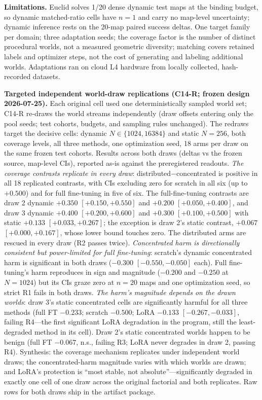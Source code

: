 \documentclass[letterpaper]{article} %
\begin{document}
\textbf{Limitations.} Euclid solves 1/20 dense dynamic test maps at the binding budget, so dynamic matched-ratio cells have $n{=}1$ and carry no map-level uncertainty; dynamic inference rests on the 20-map paired success deltas. One target family per domain; three adaptation seeds; the coverage factor is the number of distinct procedural worlds, not a measured geometric diversity; matching covers retained labels and optimizer steps, not the cost of generating and labeling additional worlds. Adaptations ran on cloud L4 hardware from locally collected, hash-recorded datasets.

\textbf{Targeted independent world-draw replications (C14-R; frozen design 2026-07-25).} Each original cell used one deterministically sampled world set; C14-R re-draws the world streams independently (draw offsets entering only the pool seeds; test cohorts, budgets, and sampling rules unchanged). The redraws target the decisive cells: dynamic $N \in \{1024, 16384\}$ and static $N{=}256$, both coverage levels, all three methods, one optimization seed, 18 arms per draw on the same frozen test cohorts. Results across both draws (deltas vs the frozen source, map-level CIs), reported as-is against the preregistered readouts. \emph{The coverage contrasts replicate in every draw}: distributed$-$concentrated is positive in all 18 replicated contrasts, with CIs excluding zero for scratch in all six (up to $+0.500$) and for full fine-tuning in five of six. The full-fine-tuning contrasts are draw 2 dynamic $+0.350$ $[+0.150,+0.550]$ and $+0.200$ $[+0.050,+0.400]$, and draw 3 dynamic $+0.400$ $[+0.200,+0.600]$ and $+0.300$ $[+0.100,+0.500]$ with static $+0.133$ $[+0.033,+0.267]$; the exception is draw 2's static contrast, $+0.067$ $[+0.000,+0.167]$, whose lower bound touches zero. The distributed arms are rescued in every draw (R2 passes twice). \emph{Concentrated harm is directionally consistent but power-limited for full fine-tuning}: scratch's dynamic concentrated harm is significant in both draws ($-0.300$ $[-0.550,-0.050]$ each). Full fine-tuning's harm reproduces in sign and magnitude ($-0.200$ and $-0.250$ at $N{=}1024$) but its CIs graze zero at $n{=}20$ maps and one optimization seed, so strict R1 fails in both draws. \emph{The harm's magnitude depends on the drawn worlds}: draw 3's static concentrated cells are significantly harmful for all three methods (full FT $-0.233$; scratch $-0.500$; LoRA $-0.133$ $[-0.267,-0.033]$, failing R4---the first significant LoRA degradation in the program, still the least-degraded method in its cell). Draw 2's static concentrated worlds happen to be benign (full FT $-0.067$, n.s., failing R3; LoRA never degrades in draw 2, passing R4). Synthesis: the coverage mechanism replicates under independent world draws; the concentrated-harm magnitude varies with which worlds are drawn; and LoRA's protection is ``most stable, not absolute''---significantly degraded in exactly one cell of one draw across the original factorial and both replicates. Raw rows for both draws ship in the artifact package.
\end{document}
